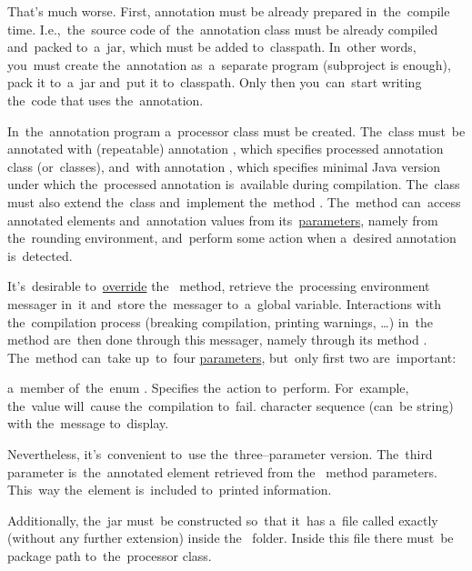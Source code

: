 That's much worse.
First, annotation must be already prepared in~the~compile time.
I.e.,~the~source code of~the~annotation class must be already compiled and~packed to~a~jar, which must be added to~classpath.
In~other words, you~must create the~annotation as~a~separate program (subproject is enough), pack it to~a~jar and~put it to~classpath.
Only then you~can~start writing the~code that uses the~annotation.

In~the~annotation program a~processor class must be created.
The~class must~be annotated with (repeatable) annotation , which specifies processed annotation class (or~classes), and~with annotation , which specifies minimal Java version under which the~processed annotation is~available during compilation.
The~class must also extend the~class  and~implement the~method .
The~method can~access annotated elements and~annotation values from its~\hyperref[parameterargument]{parameters}, namely from the~rounding environment, and~perform some action when a~desired annotation is~detected.

It's~desirable to~\hyperref[javaoverride]{override} the~ method, retrieve the~processing environment messager in~it and~store the~messager to~a~global variable.
Interactions with the~compilation process (breaking compilation, printing warnings, \dots) in~the~ method are~then done through this messager, namely through its method .
The~method can~take up~to~four \hyperref[parameterargument]{parameters}, but~only first two are~important:
\begin{itemize}
     a~member of~the~enum .
             Specifies the~action to~perform.
             For~example, the~value  will~cause the~compilation to~fail.
     character sequence (can~be string) with the~message to~display.
\end{itemize}
\noindent Nevertheless, it's~convenient to~use the~three--parameter version.
The~third parameter is~the~annotated element retrieved from the~ method parameters.
This~way the~element is~included to~printed information.

Additionally, the~jar must~be constructed so~that it~has a~file called exactly  (without any further extension) inside the~ folder.
Inside this file there must~be package path to~the~processor class.
\newpage

